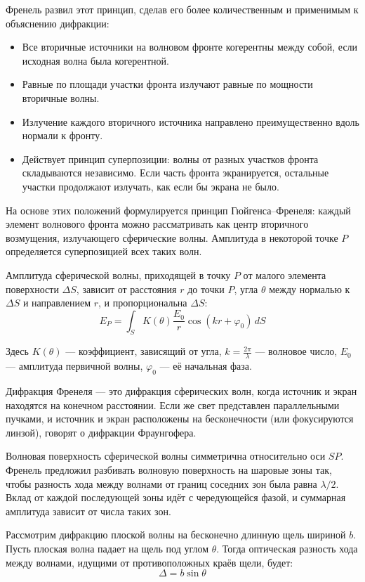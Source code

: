 \documentclass[12pt]{article}
\begin{document}
Френель развил этот принцип, сделав его более количественным и применимым к объяснению дифракции:
\begin{itemize}
  \item Все вторичные источники на волновом фронте когерентны между собой, если исходная волна была когерентной.
  \item Равные по площади участки фронта излучают равные по мощности вторичные волны.
  \item Излучение каждого вторичного источника направлено преимущественно вдоль нормали к фронту.
  \item Действует принцип суперпозиции: волны от разных участков фронта складываются независимо. Если часть фронта экранируется, остальные участки продолжают излучать, как если бы экрана не было.
\end{itemize}

На основе этих положений формулируется принцип Гюйгенса–Френеля: каждый элемент волнового фронта можно рассматривать как центр вторичного возмущения, излучающего сферические волны. Амплитуда в некоторой точке $P$ определяется суперпозицией всех таких волн.

Амплитуда сферической волны, приходящей в точку $P$ от малого элемента поверхности $\Delta S$, зависит от расстояния $r$ до точки $P$, угла $\theta$ между нормалью к $\Delta S$ и направлением $r$, и пропорциональна $\Delta S$:
\[ E_P = \int_S K(\theta) \frac{E_0}{r} \cos(kr + \varphi_0)\, dS \]

Здесь $K(\theta)$ — коэффициент, зависящий от угла, $k = \frac{2\pi}{\lambda}$ — волновое число, $E_0$ — амплитуда первичной волны, $\varphi_0$ — её начальная фаза.

Дифракция Френеля — это дифракция сферических волн, когда источник и экран находятся на конечном расстоянии. Если же свет представлен параллельными пучками, и источник и экран расположены на бесконечности (или фокусируются линзой), говорят о дифракции Фраунгофера.

Волновая поверхность сферической волны симметрична относительно оси $SP$. Френель предложил разбивать волновую поверхность на шаровые зоны так, чтобы разность хода между волнами от границ соседних зон была равна $\lambda/2$. Вклад от каждой последующей зоны идёт с чередующейся фазой, и суммарная амплитуда зависит от числа таких зон.

Рассмотрим дифракцию плоской волны на бесконечно длинную щель шириной $b$. Пусть плоская волна падает на щель под углом $\theta$. Тогда оптическая разность хода между волнами, идущими от противоположных краёв щели, будет:
\[ \Delta = b \sin \theta \]
\end{document}
